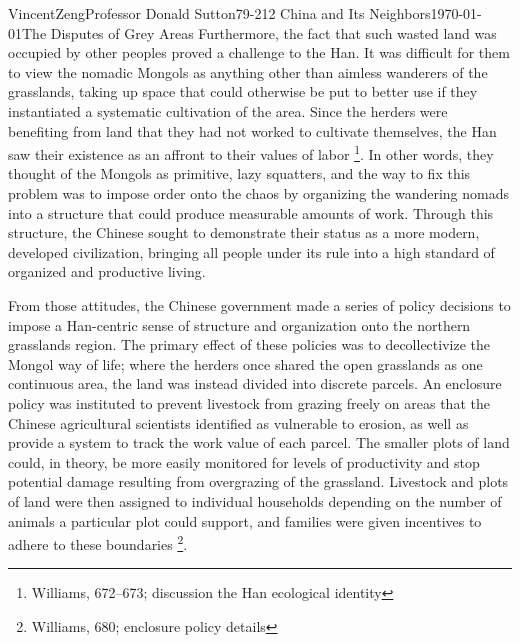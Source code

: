 \documentclass{article}[12pt]
\begin{document}
\begin{mla}{Vincent}{Zeng}{Professor Donald Sutton}{79-212 China and Its Neighbors}{\today}{The Disputes of Grey Areas}
	Furthermore, the fact that such wasted land was occupied by other
	peoples proved a challenge to the Han. It was difficult for them to
	view the nomadic Mongols as anything other than aimless wanderers of
	the grasslands, taking up space that could otherwise be put to better
	use if they instantiated a systematic cultivation of the area. Since the
	herders were benefiting from land that they had not worked to
	cultivate themselves, the Han saw their existence as an affront to their values
	of labor \footnote{Williams, 672--673; discussion the Han ecological
	identity}. In other words, they thought of the Mongols as primitive,
	lazy squatters, and the way to fix this problem was to impose order
	onto the
	chaos by organizing the wandering nomads into a structure that could
	produce measurable amounts of work. Through this structure, the
	Chinese sought to demonstrate their status as a more modern, developed
	civilization, bringing all people under its rule into a high standard
	of organized and productive living.

	From those attitudes, the Chinese government made a series of policy decisions to
	impose a Han-centric sense of structure and organization onto the
	northern grasslands region. The primary effect of these policies was to
	decollectivize the Mongol way of life; where the herders once shared
	the open grasslands as one continuous area, the land was instead
	divided into discrete parcels.  An enclosure policy was instituted to
	prevent livestock from grazing freely on areas that the Chinese
	agricultural scientists identified as vulnerable to erosion, as well as provide a system to track the work value of each parcel. 
	The smaller plots of land could, in theory, be more easily monitored
	for levels of productivity and stop potential damage resulting from
	overgrazing of the grassland. Livestock and plots of land were then assigned
	to individual households depending on the number of animals a
	particular plot could support, and families were given incentives to adhere to
	these boundaries \footnote{Williams, 680; enclosure policy details}.


\end{mla}
\end{document}
